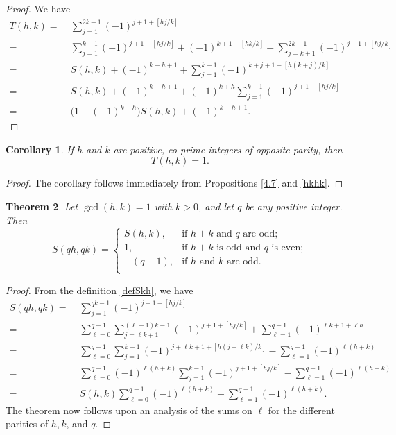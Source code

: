 \documentclass[11pt,reqno]{amsart}
\theoremstyle{plain}
\numberwithin{equation}{section}
\newtheorem{theorem}{Theorem}[section]
\newtheorem{corollary}[theorem]{Corollary}
\begin{document}
\begin{proof}  We have
\allowdisplaybreaks
\begin{align*}
T(h,k) =&\; \sum_{j=1}^{2k-1} (-1)^{j+1 + [hj/k]}\\
=&\; \sum_{j=1}^{k-1} (-1)^{j+1 + [hj/k]} + (-1)^{k+1+[hk/k]} + \sum_{j=k+1}^{2k-1} (-1)^{j+1 + [hj/k]}\\
=&\; S(h,k) + (-1)^{k+h+1} + \sum_{j=1}^{k-1} (-1)^{k+j+1 + [h(k+j)/k]}\\
=&\; S(h,k) + (-1)^{k+h+1} + (-1)^{k+h} \sum_{j=1}^{k-1} (-1)^{j+1 + [hj/k]}\\
=&\; \bigl(1+(-1)^{k+h}\bigr) S(h,k) + (-1)^{k+h+1}.
\end{align*}
\end{proof}

\begin{corollary}
    \label{g1} If $h$ and $k$ are positive, co-prime integers of opposite parity, then
$$T(h,k) = 1.$$
\end{corollary}

\begin{proof} The corollary follows immediately from Propositions \ref{4.7} and \ref{hkhk}.
\end{proof}



\begin{theorem} Let $\gcd(h,k)=1$ with $k>0$, and let $q$ be any positive integer.  Then
\begin{equation*}
S(qh,qk) = \begin{cases} S(h,k), &\text{if $h+k$ and $q$ are odd};\\
1,  &\text{if $h+k$ is odd and $q$ is even};\\
-(q-1),  &\text{if $h$ and $k$ are odd}.\\
\end{cases}
\end{equation*}
\end{theorem}

\allowdisplaybreaks
\begin{proof}  From the definition \eqref{defSkh}, we have
\begin{align*}
S(qh, qk) =&\; \sum_{j=1}^{qk-1}(-1)^{j+1+[hj/k]}\\
=&\; \sum_{\ell=0}^{q-1}\sum_{j=\ell k +1}^{(\ell+1)k -1}(-1)^{j+1+[hj/k]} + \sum_{\ell=1}^{q-1} (-1)^{\ell k + 1 + \ell h}\\
=&\; \sum_{\ell=0}^{q-1}\sum_{j=1}^{k -1}(-1)^{j+\ell k+1+[h(j+\ell k)/k]} - \sum_{\ell=1}^{q-1} (-1)^{\ell (h + k)}\\
=&\; \sum_{\ell=0}^{q-1}(-1)^{\ell(h+k)}\sum_{j=1}^{k -1}(-1)^{j+1+[hj/k]} - \sum_{\ell=1}^{q-1} (-1)^{\ell (h + k)}\\
=&\; S(h,k)\sum_{\ell=0}^{q-1}(-1)^{\ell(h+k)} - \sum_{\ell=1}^{q-1} (-1)^{\ell (h + k)}.
\end{align*}
The theorem now follows upon an analysis of the sums on $\ell$ for the different parities of $h,k$, and $q$.
\end{proof}
\end{document}
